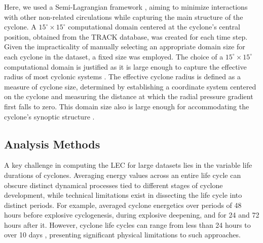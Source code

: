 \documentclass[pdflatex,sn-chicago]{sn-jnl}%
\theoremstyle{plain}
\theoremstyle{definition}
\theoremstyle{remark}
\theoremstyle{definition}
\begin{document}
Here, we used a Semi-Lagrangian framework \citep{michaelides1999quasi}, aiming to minimize interactions with other non-related circulations while capturing the main structure of the cyclone. A $15^\circ \times 15^\circ$ computational domain centered at the cyclone's central position, obtained from the TRACK database, was created for each time step. Given the impracticality of manually selecting an appropriate domain size for each cyclone in the dataset, a fixed size was employed. The choice of a $15^\circ \times 15^\circ$ computational domain is justified as it is large enough to capture the effective radius of most cyclonic systems \citep{rudeva2007climatology}. The effective cyclone radius is defined as a measure of cyclone size, determined by establishing a coordinate system centered on the cyclone and measuring the distance at which the radial pressure gradient first falls to zero. This domain size also is large enough for accommodating the cyclone's synoptic structure \citep[e.g.][]{gramcianinov2019properties}.


\subsection{Analysis Methods}

A key challenge in computing the LEC for large datasets lies in the variable life durations of cyclones. Averaging energy values across an entire life cycle can obscure distinct dynamical processes tied to different stages of cyclone development, while technical limitations exist in dissecting the life cycle into distinct periods. For example, \citet{black2013universal} averaged cyclone energetics over periods of 48 hours before explosive cyclogenesis, during explosive deepening, and for 24 and 72 hours after it. However, cyclone life cycles can range from less than 24 hours to over 10 days \citep{trigo2006climatology,reboita2010south,gramcianinov2019properties}, presenting significant physical limitations to such approaches.
\end{document}
